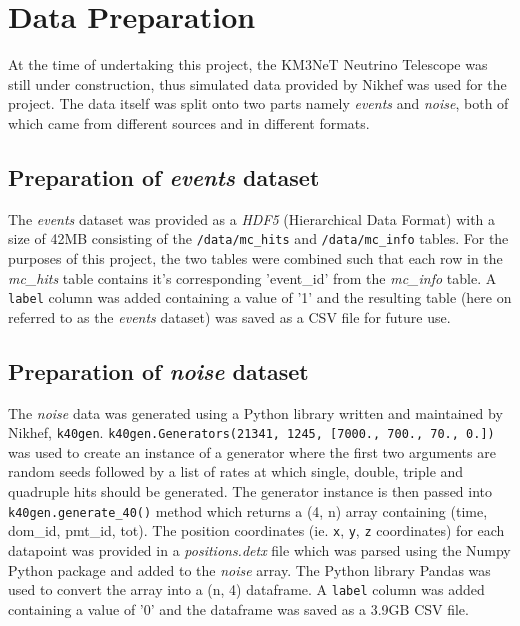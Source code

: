 
\chapter{Data Preparation} %


\graphicspath{{1-introduction/figures/}}


At the time of undertaking this project, the KM3NeT Neutrino Telescope was
still under construction, thus  simulated data provided by Nikhef was used for
the project. The data itself was split onto two parts namely \emph{events} and
\emph{noise}, both of which came from different sources and in different
formats.

\section{Preparation of \emph{events} dataset}%
\label{sec:data-prep-events}
The \emph{events} dataset was provided as a \emph{HDF5} (Hierarchical Data
Format) with a size of 42MB consisting of the \texttt{/data/mc\_hits} and
\texttt{/data/mc\_info} tables. For the purposes of this project, the two
tables were combined such that each row in the \textit{mc\_hits} table contains
it's corresponding 'event\_id' from the \textit{mc\_info}
table. A \texttt{label} column was added containing a value of '1' and the
resulting table (here on referred to as the \emph{events} dataset) was saved as
a CSV file for future use.

\section{Preparation of \emph{noise} dataset}%
\label{sec:data-prep-noise}
The \emph{noise} data was generated using a Python library written and
maintained by Nikhef, \texttt{k40gen}. \texttt{k40gen.Generators(21341, 1245,
[7000., 700., 70., 0.])} was used to create an instance of a generator where
the first two arguments are random seeds followed by a list of rates at which
single, double, triple and quadruple hits should be generated. The generator
instance is then passed into \texttt{k40gen.generate\_40()} method which
returns a (4, n) array containing (time, dom\_id, pmt\_id, tot). The position
coordinates (ie. \texttt{x}, \texttt{y}, \texttt{z} coordinates) for each
datapoint was provided in a \emph{positions.detx} file which was parsed using
the Numpy Python package \cite{numpy} and added to the \emph{noise} array. The
Python library Pandas \cite{pandas} was used to convert the array into a (n, 4)
dataframe. A \texttt{label} column was added containing a value of '0' and the
dataframe was saved as a 3.9GB CSV file.

